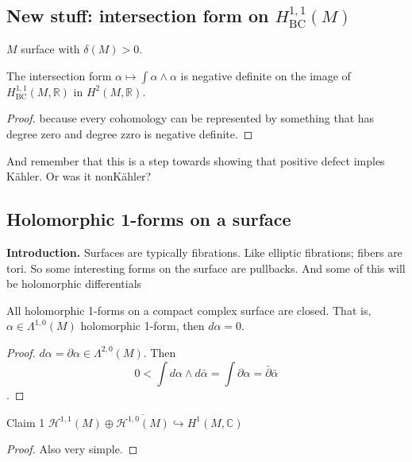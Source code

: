\subsection{New stuff: intersection form on \(H^{1,1}_{\operatorname{BC}}(M)\)}

\begin{prop}\leavevmode
\(M\) surface with \(\delta(M)>0\).

The intersection form \(\alpha \mapsto  \int\alpha \wedge \alpha\) is negative definite on the image of \(H^{1,1}_{\operatorname{BC}}(M,\mathbb{R})\) in \(H^{2}(M,\mathbb{R})\).
\end{prop}

\begin{proof}\leavevmode
because every cohomology can be represented by something that has degree zero and degree zzro is negative definite.
\end{proof}

And remember that this is a step towards showing that positive defect imples Kähler. Or was it nonKähler?

\subsection{Holomorphic 1-forms on a surface}

\textbf{Introduction.} Surfaces are typically fibrations. Like elliptic fibrations; fibers are tori. So some interesting forms on the surface are pullbacks. And some of this will be holomorphic differentials

\begin{lemma}\leavevmode
All holomorphic 1-forms on a compact complex surface are closed. That is, \(\alpha \in \Lambda^{1,0}(M)\) holomorphic 1-form, then \(d\alpha=0\).
\end{lemma}

\begin{proof}\leavevmode
\(d \alpha= \partial  \alpha \in \Lambda^{ 2,0}(M)\). Then
\[0 < \int d \alpha \wedge d \bar{\alpha} = \int \partial  \alpha = \bar\partial \bar{ \alpha}\].
\end{proof}

\begin{thing3}{Claim 1}\leavevmode
\(\mathcal{H}^{1,1}(M) \oplus  \overline{\mathcal{H}^{1,0}(M)}\hookrightarrow H^{1}(M,\mathbb{C})\)
\end{thing3}

\begin{proof}\leavevmode
Also very simple.
\end{proof}

























